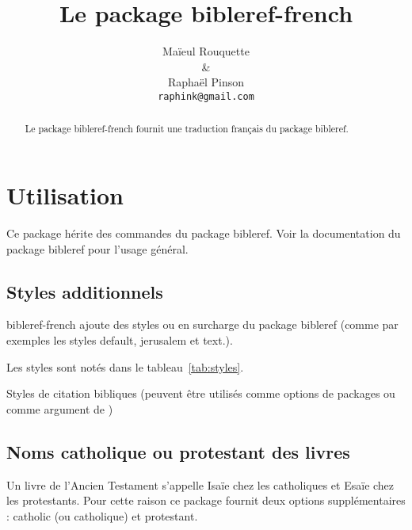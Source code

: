 \documentclass{ltxdoc}
\begin{document}
\shorthandoff{:}
\title{Le package \textsf{bibleref-french}}
\author{Ma\"ieul Rouquette \\ \& \\ Rapha\"el Pinson \\ \texttt{raphink@gmail.com}}

\maketitle
\begin{abstract}
Le  package \textsf{bibleref-french} fournit une traduction français du package \textsf{bibleref}.
\end{abstract}

\tableofcontents
\section{Utilisation}

Ce package hérite des commandes du package \textsf{bibleref}. Voir la documentation du package \textsf{bibleref} pour l'usage général.

\subsection{Styles additionnels}

\textsf{bibleref-french} ajoute des styles ou en surcharge du package \textsf{bibleref} (comme par exemples les styles \textsf{default}, \textsf{jerusalem} et \textsf{text}.).

Les styles sont notés dans le tableau~\ref{tab:styles}.

\begin{table}[tbh]
\caption{Styles de citation bibliques  (peuvent être utilisés comme options de  packages ou comme argument de  )}
\label{tab:styles}
\vspace{10pt}
\begin{center}

\end{center}
\end{table}

\subsection{Noms catholique ou protestant des livres}

Un livre de l'Ancien Testament s'appelle Isaïe chez les catholiques et Esaïe chez les protestants.
Pour cette raison ce package fournit deux options supplémentaires :  \textsf{catholic} (ou \textsf{catholique}) et \textsf{protestant}. 
\end{document}
